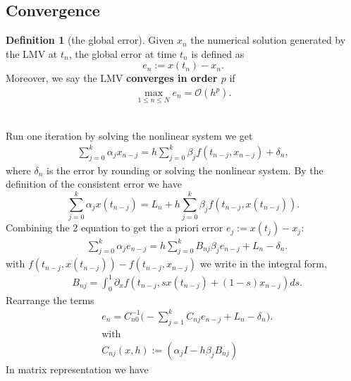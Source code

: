 \documentclass[a4paper,12pt,oneside,fleqn]{book}
\theoremstyle{definition}
\newtheorem{definition}{Definition}[section]
\theoremstyle{remark}
\begin{document}
\subsection{Convergence}
\begin{definition}[the global error]
	Given $x_n$ the numerical solution generated by the LMV at $t_n$, the global error at time $t_n$ is defined as 
	\begin{equation}
		e_n:= x(t_n) - x_n.
	\end{equation}
	Moreover, we say the LMV \textbf{converges in order $p$} if 
	\begin{align*}
		\max_{1 \le n \le N} e_n = \mathcal{O}(h^p).
	\end{align*}
\end{definition}
\quad\\
Run one iteration by solving the nonlinear system we get
\begin{align*}
	\sum_{j = 0}^k \alpha_j x_{n - j} = h \sum_{j = 0}^k \beta_j f(t_{n - j}, x_{n - j}) + \delta_n,
\end{align*} 
where $\delta_n$ is the error by rounding or solving the nonlinear system. By the definition of the consistent error we have
\begin{equation*}
	\sum_{j = 0}^k \alpha_j x(t_{n - j}) = L_n + h \sum_{j = 0}^k \beta_j f(t_{n - j}, x(t_{n - j})).
\end{equation*}
Combining the 2 equation to get the a priori error $e_j:= x(t_j) - x_j$:
\begin{align*}
	& \sum_{j = 0}^k \alpha_j e_{n - j} = h \sum_{j = 0}^k B_{nj} \beta_j e_{n - j} + L_n - \delta_n.
\end{align*}
with $f(t_{n - j}, x(t_{n - j})) - f(t_{n - j}, x_{n - j})$ we write in the integral form, 
\begin{align*}
	& B_{nj} = \int_0^1 \partial_xf (t_{n- j},  sx(t_{n - j}) + (1 - s) x_{n - j})ds. 
\end{align*}
Rearrange the terms 
\begin{equation*}
\begin{aligned}
	& e_n = C_{n0}^{- 1} \bigg( - \sum_{j = 1}^k C_{nj} e_{n -j} + L_n - \delta_n \bigg).\\
	& \text{with}\\
	& C_{nj}(x, h) := (\alpha_jI - h \beta_j B_{nj}) 
\end{aligned}
\end{equation*}
In matrix representation we have
\end{document}
